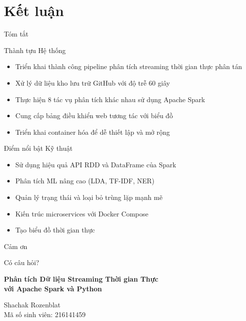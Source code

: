 \documentclass[aspectratio=169]{beamer}
\begin{document}
\section{Kết luận}

\begin{frame}{Tóm tắt}
    \begin{block}{Thành tựu Hệ thống}
        \begin{itemize}
            \item Triển khai thành công pipeline phân tích streaming thời gian thực phân tán
            \item Xử lý dữ liệu kho lưu trữ GitHub với độ trễ 60 giây
            \item Thực hiện 8 tác vụ phân tích khác nhau sử dụng Apache Spark
            \item Cung cấp bảng điều khiển web tương tác với biểu đồ
            \item Triển khai container hóa để dễ thiết lập và mở rộng
        \end{itemize}
    \end{block}
    
    \vspace{0.3cm}
    \begin{block}{Điểm nổi bật Kỹ thuật}
        \begin{itemize}
            \item Sử dụng hiệu quả API RDD và DataFrame của Spark
            \item Phân tích ML nâng cao (LDA, TF-IDF, NER)
            \item Quản lý trạng thái và loại bỏ trùng lặp mạnh mẽ
            \item Kiến trúc microservices với Docker Compose
            \item Tạo biểu đồ thời gian thực
        \end{itemize}
    \end{block}
\end{frame}

\begin{frame}{Cảm ơn}
    \begin{center}
        \Huge Có câu hỏi?
        
        \vspace{1cm}
        \Large
        \textbf{Phân tích Dữ liệu Streaming Thời gian Thực}\\
        \textbf{với Apache Spark và Python}
        
        \vspace{0.5cm}
        \normalsize
        Shachak Rozenblat\\
        Mã số sinh viên: 216141459
    \end{center}
\end{frame}
\end{document}
